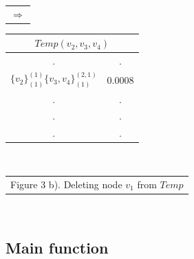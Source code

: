 \documentclass[12pt]{article}
\begin{document}
\begin{table}[!htb]
\begin{minipage}{.06\linewidth}
        \begin{tabular}{c}
     $ \Rightarrow$\\
        \end{tabular}
    \end{minipage}%
    \begin{minipage}{.3\linewidth}
      \centering
     \begin{tabular}{cc}
\multicolumn{2}{c}{$Temp(v_2,v_3,v_4)$}                           \\ \hline
\multicolumn{1}{|c}{.} & \multicolumn{1}{|c|}{.} \\ \hline
  \multicolumn{1}{|l}{$\{v_2\}^{(1)}_{(1)}\{v_3,v_4\}^{(2,1)}_{(1)}$} & \multicolumn{1}{|l|}{$0.0008$} \\ \hline         
                   \multicolumn{1}{|c}{.} & \multicolumn{1}{|c|}{.} \\ \hline                 
                   \multicolumn{1}{|c}{.} & \multicolumn{1}{|c|}{.} \\ \hline
                   \multicolumn{1}{|c}{.} & \multicolumn{1}{|c|}{.} \\ \hline        
\end{tabular}
    \end{minipage}\\
      \begin{minipage}{1.0\linewidth}
       \centering
            \begin{tabular}{c}
Figure 3 b). Deleting node $v_1$ from $Temp$
        \end{tabular}
    \end{minipage}\\
\end{table}

\subsection{Main function}
\end{document}
